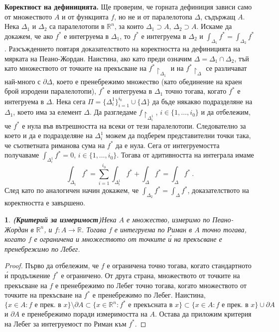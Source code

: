 \documentclass[11pt]{article}
\numberwithin{equation}{section}
\numberwithin{figure}{section}
\numberwithin{table}{section}
\theoremstyle{plain}
\theoremstyle{definition}
\theoremstyle{remark}
\theoremstyle{definition}
\theoremstyle{remark}
\theoremstyle{plain}
\theoremstyle{definition}
\theoremstyle{definition}
\theoremstyle{plain}
\theoremstyle{plain}
\newtheorem{prop}[thm]{\protect\propositionname}
\theoremstyle{plain}
\theoremstyle{definition}
\theoremstyle{plain}
\providecommand{\propositionname}{Твърдение}
\newcommand*{\R}{\mathbb{R}}
\begin{document}
\textbf{Коректност на дефиницията.} Ще проверим, че горната дефиниция зависи само от множеството $A$ и от функцията $f$, но не и от паралелотопа $\Delta$, съдържащ $A$. Нека $\Delta_1$ и $\Delta_2$ са паралелотопи в $\R^n$, за които $\Delta_1\supset A$, $\Delta_2\supset A$. Искаме да докажем, че ако $f^*$ е интегруема в $\Delta_1$, то $f^*$ е интегруема в $\Delta_2$ и $\int_{\Delta_1} f^* =\int_{\Delta_2} f^*$. Разсъждението повтаря доказателството на коректността на дефиницията на мярката на Пеано-Жордан. Наистина, ако като преди означим $\Delta=\Delta_1\cap \Delta_2$, тъй като множеството от точките на прекъсване на $f^*\restriction_{\Delta_1}$ и на $f^*\restriction_{\Delta}$ се различават най-много с $\partial \Delta$, което е пренебрежимо множество (като обединение на краен брой изродени паралелотопи), $f^*$ е интегруема в $\Delta_1$ точно тогава, когато $f^*$ е интегруема в $\Delta$. Нека сега $\Pi=\{ \Delta^1_i\}_{i=1}^{i_0}\cup \{ \Delta\}$ да бъде някакво подразделяне на $\Delta_1$, което има за елемент $\Delta$. Да разгледаме $f\restriction_{\Delta^1_i}$, $i\in \{1,\dots ,i_0\}$ и да отбележим, че $f^*$ е нула във вътрешността на всеки от тези паралелотопи. Следователно за което и да е подразделяне на $\Delta^1_i$ можем да подберем представителни точки така, че съответната риманова сума на $f^*$ да е нула. Сега от интегруемостта получаваме $\int_{\Delta^1_i} f^*=0$, $i\in \{1,\dots ,i_0\}$. Тогава от адитивността на интеграла имаме
$$\int_{\Delta_1}f^* =\sum_{i=1}^{i_0}\int_{\Delta^1_i}f^* +\int_{\Delta}f^* =\int_{\Delta}f^* \ .$$
След като по аналогичен начин докажем, че $\int_{\Delta_2}f^* =\int_{\Delta}f^*$, доказателството на коректността е завършено.

\begin{prop}
\textbf{(Критерий за измеримост)}\label{criterion_on_sets}
Нека $A$ е множество, измеримо по Пеано-Жордан в $\R^n$, и $f:A\longrightarrow \R$. Тогава $f$ е интегруема по Риман в $A$ точно тогава, когато $f$ е ограничена и множеството от точките \'{и} на прекъсване е пренебрежимо по Лебег.
\end{prop}

\begin{proof}
Първо да отбележим, че $f$ е ограничена точно тогава, когато стандартното \'{и} продължение $f^*$ е ограничено. От друга страна, множеството от точките на прекъсване на $f$ е пренебрежимо по Лебег точно тогава, когато множеството от точките на прекъсване на $f^*$ е пренебрежимо по Лебег. Наистина,
$$\{ x\in A : f \mbox{ е прек. в } x\}\setminus \partial A\subset\{ x\in \R^n : f^* \mbox{ е прекъсната в } x\}\subset\{ x\in A : f \mbox{ е прек. в } x\} \cup \partial A $$
и $\partial A$ е пренебрежимо поради измеримостта на $A$. Остава да приложим критерия на Лебег за интегруемост по Риман към $f^*$.
\end{proof}
\end{document}
